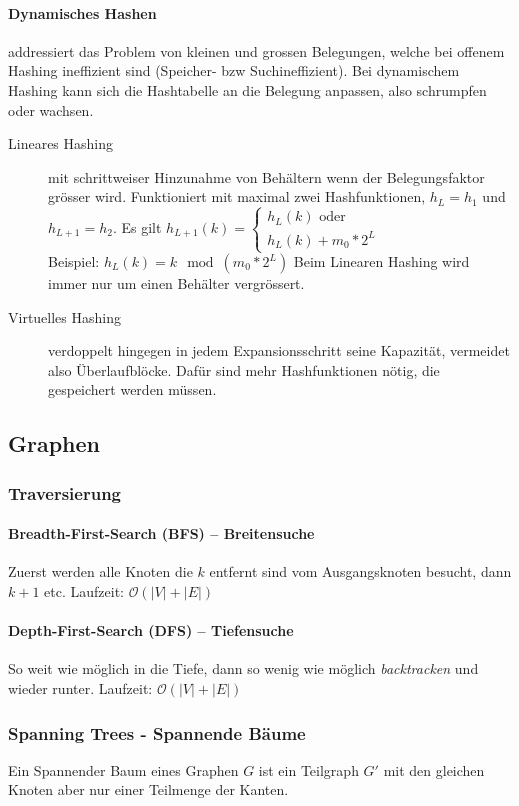 \documentclass[a4paper, 9pt, DIV=20]{scrartcl}
\newcommand{\Oh}{\mathcal{O}}
\begin{document}
\paragraph{Dynamisches Hashen} addressiert das Problem von kleinen und grossen Belegungen, welche bei offenem Hashing ineffizient sind (Speicher- bzw Suchineffizient). Bei dynamischem Hashing kann sich die Hashtabelle an die Belegung anpassen, also schrumpfen oder wachsen.
\begin{description}
\item[Lineares Hashing] mit schrittweiser Hinzunahme von Behältern wenn der Belegungsfaktor grösser wird. Funktioniert mit maximal zwei Hashfunktionen, $h_{L}=h_{1}$ und $h_{L+1}=h_{2}$. Es gilt $h_{L+1}(k) = \begin{cases}
h_{L}(k) \text{ oder}\\ h_{L}(k)+m_{0}*2^{L} \end{cases}$ \\ Beispiel: $h_{L}(k)=k\mod{(m_{0}*2^{L})}$ Beim Linearen Hashing wird immer nur um einen Behälter vergrössert.
\item[Virtuelles Hashing] verdoppelt hingegen in jedem Expansionsschritt seine Kapazität, vermeidet also Überlaufblöcke. Dafür sind mehr Hashfunktionen nötig, die gespeichert werden müssen. 
\end{description}

\subsection{Graphen}\label{graphalgos}
\subsubsection{Traversierung}
\paragraph{Breadth-First-Search (BFS) -- Breitensuche} Zuerst werden alle Knoten die $k$ entfernt sind vom Ausgangsknoten besucht, dann $k+1$ etc. Laufzeit: $\Oh(|V| + |E|)$

\paragraph{Depth-First-Search (DFS) -- Tiefensuche} So weit wie möglich in die Tiefe, dann so wenig wie möglich \emph{backtracken} und wieder runter. Laufzeit: $\Oh(|V| + |E|)$


\subsubsection{Spanning Trees - Spannende Bäume}
Ein Spannender Baum eines Graphen $G$ ist ein Teilgraph $G'$ mit den gleichen Knoten aber nur einer Teilmenge der Kanten.
\end{document}
